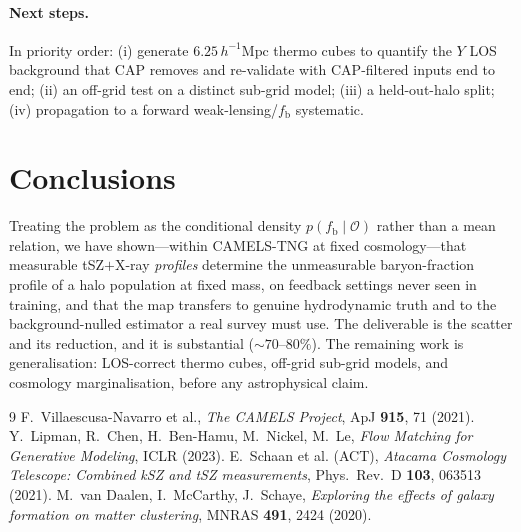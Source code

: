 \documentclass[11pt]{article}
\newcommand{\fb}{f_{\mathrm{b}}}
\newcommand{\hMpc}{h^{-1}\mathrm{Mpc}}
\newcommand{\Ysz}{Y}
\begin{document}
\paragraph{Next steps.} In priority order: (i) generate $6.25\,\hMpc$ thermo cubes to
quantify the $\Ysz$ LOS background that CAP removes and re-validate with CAP-filtered
inputs end to end; (ii) an off-grid test on a distinct sub-grid model; (iii) a
held-out-halo split; (iv) propagation to a forward weak-lensing/$\fb$ systematic.

\section{Conclusions}
\label{sec:conc}
Treating the problem as the conditional density $p(\fb\mid\mathcal{O})$ rather than a
mean relation, we have shown---within CAMELS-TNG at fixed cosmology---that measurable
tSZ$+$X-ray \emph{profiles} determine the unmeasurable baryon-fraction profile of a
halo population at fixed mass, on feedback settings never seen in training, and that
the map transfers to genuine hydrodynamic truth and to the background-nulled
estimator a real survey must use. The deliverable is the scatter and its reduction,
and it is substantial ($\sim70\text{--}80\%$). The remaining work is generalisation:
LOS-correct thermo cubes, off-grid sub-grid models, and cosmology marginalisation,
before any astrophysical claim.

\begin{thebibliography}{9}
\small
{} F.~Villaescusa-Navarro et al., \emph{The CAMELS Project}, ApJ
\textbf{915}, 71 (2021).
 Y.~Lipman, R.~Chen, H.~Ben-Hamu, M.~Nickel, M.~Le, \emph{Flow Matching
for Generative Modeling}, ICLR (2023).
 E.~Schaan et al. (ACT), \emph{Atacama Cosmology Telescope: Combined
kSZ and tSZ measurements}, Phys.\ Rev.\ D \textbf{103}, 063513 (2021).
 M.~van Daalen, I.~McCarthy, J.~Schaye, \emph{Exploring the effects of
galaxy formation on matter clustering}, MNRAS \textbf{491}, 2424 (2020).
\end{thebibliography}
\end{document}
